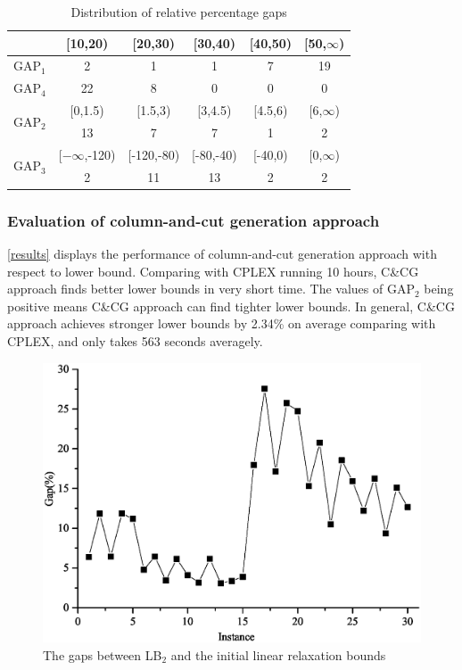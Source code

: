 \documentclass[11pt,nonblindrev,fleqn]{article}
\begin{document}
\begin{table}[H]
\setlength{\abovecaptionskip}{-3pt}
\setlength{\belowcaptionskip}{5pt}
\centering
  \footnotesize
  \caption{Distribution of relative percentage gaps}
  \label{distributions}

\begin{tabular}{cccccc}
\hline
      & [10,20) & [20,30) & [30,40) & [40,50) & [50,$\infty$) \bigstrut\\
\hline
GAP$_1$ & 2     & 1     & 1     & 7     & 19 \bigstrut[t]\\
GAP$_4$ & 22    & 8     & 0     & 0     & 0 \bigstrut[b]\\
\hline
\multirow{2}[4]{*}{GAP$_2$} & [0,1.5) & [1.5,3) & [3,4.5) & [4.5,6) & [6,$\infty$) \bigstrut\\
\cline{2-6}      & 13    & 7     & 7     & 1     & 2 \bigstrut\\
\hline
\multirow{2}[4]{*}{GAP$_3$} & [$-\infty$,-120) & [-120,-80) & [-80,-40) & [-40,0) & [0,$\infty$) \bigstrut\\
\cline{2-6}      & 2     & 11    & 13    & 2     & 2 \bigstrut\\
\hline
\end{tabular}%

\end{table}%

\subsubsection{Evaluation of column-and-cut generation approach}
\autoref{results} displays the performance of column-and-cut generation approach with respect to lower bound. Comparing with CPLEX running 10 hours, C\&CG approach finds better lower bounds in very short time. The values of GAP$_2$ being positive means C\&CG approach can find tighter lower bounds. In general, C\&CG approach achieves stronger lower bounds by 2.34\% on average comparing with CPLEX, and only takes 563 seconds averagely.

\begin{figure}[H]
\setlength{\abovecaptionskip}{-5pt}
\setlength{\belowcaptionskip}{-5pt}
\centering
\includegraphics[width=0.8\linewidth]{F5.eps}
\caption{The gaps between LB$_2$ and the initial linear relaxation bounds}
\label{LPgaps}
\end{figure}
\end{document}
